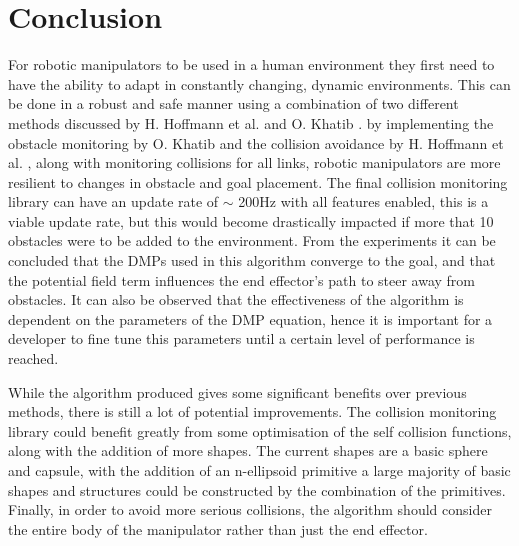 \documentclass[a4paper, 10pt, conference]{ieeeconf}      %
\begin{document}
\section{Conclusion}
For robotic manipulators to be used in a human environment they first need to have the ability to adapt in constantly changing, dynamic environments. This can be done in a robust and safe manner using a combination of two different methods discussed by H. Hoffmann et al. \cite{Hoffmann} and O. Khatib \cite{Khatib}. by implementing the obstacle monitoring by O. Khatib \cite{Khatib} and the collision avoidance by H. Hoffmann et al. \cite{Hoffmann}, along with monitoring collisions for all links, robotic manipulators are more resilient to changes in obstacle and goal placement. The final collision monitoring library can have an update rate of $\sim$ 200Hz with all features enabled, this is a viable update rate, but this would become drastically impacted if more that 10 obstacles were to be added to the environment. %
From the experiments it can be concluded that the DMPs used in this algorithm converge to the goal, and that the potential field term influences the end effector's path to steer away from obstacles. 
It can also be observed that the effectiveness of the algorithm is dependent on the parameters of the DMP equation, hence it is important for a developer to fine tune this parameters until a certain level of performance is reached.
 
While the algorithm produced gives some significant benefits over previous methods, there is still a lot of potential improvements. The collision monitoring library could benefit greatly from some optimisation of the self collision functions, along with the addition of more shapes. The current shapes are a basic sphere and capsule, with the addition of an n-ellipsoid primitive a large majority of basic shapes and structures could be constructed by the combination of the primitives. %
Finally, in order to avoid more serious collisions, the algorithm should consider the entire body of the manipulator rather than just the end effector. 



\addtolength{\textheight}{-12cm}   %
\end{document}
